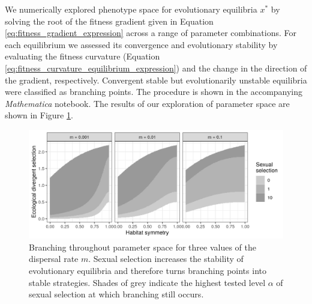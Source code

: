 We numerically explored phenotype space for evolutionary equilibria $x^*$ by solving the root of the fitness gradient given in Equation \ref{eq:fitness_gradient_expression} across a range of parameter combinations. For each equilibrium we assessed its convergence and evolutionary stability by evaluating the fitness curvature (Equation \ref{eq:fitness_curvature_equilibrium_expression}) and the change in the direction of the gradient, respectively. Convergent stable but evolutionarily unstable equilibria were classified as branching points. The procedure is shown in the accompanying \textit{Mathematica} notebook. The results of our exploration of parameter space are shown in Figure \ref{fig:adaptive_dynamics}.

\begin{figure}
    \centering
    \includegraphics[width=\textwidth]{figures/branching_points}
    \caption{Branching throughout parameter space for three values of the dispersal rate $m$. Sexual selection increases the stability of evolutionary equilibria and therefore turns branching points into stable strategies. Shades of grey indicate the highest tested level $\alpha$ of sexual selection at which branching still occurs.}
    \label{fig:adaptive_dynamics}
\end{figure}

